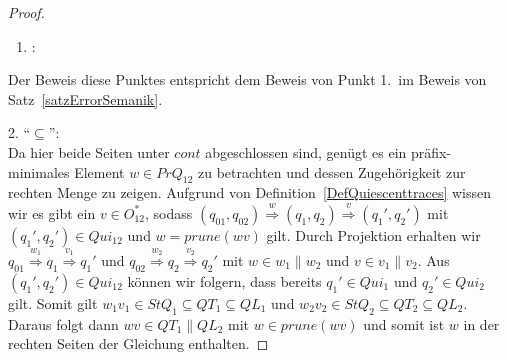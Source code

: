 \begin{proof}
  ~
  \begin{enumerate}
    \item \hspace{-0.2cm}:
  \end{enumerate}
  \vspace{-0.3cm}
  Der Beweis diese Punktes entspricht dem Beweis von Punkt 1.\ im Beweis von
  Satz~\ref{satzErrorSemanik}.

  2. ``$\subseteq$'':\\
  Da hier beide Seiten unter $cont$ abgeschlossen sind, genügt es ein
  präfix-minimales Element $w\in PrQ_{12}$ zu betrachten und dessen
  Zugehörigkeit zur rechten Menge zu zeigen. Aufgrund von
  Definition~\ref{DefQuiescenttraces} wissen wir es gibt ein $v\in O_{12}^*$,
  sodass $(q_{01},q_{02}) \overset{w}{\Rightarrow} (q_1,q_2)
  \overset{v}{\Rightarrow} (q_1',q_2')$ mit $(q_1',q_2')\in Qui_{12}$ und
  $w=prune(wv)$ gilt. Durch Projektion erhalten wir $q_{01}
  \overset{w_1}{\Rightarrow} q_1 \overset{v_1}{\Rightarrow} q_1'$ und $q_{02}
  \overset{w_2}{\Rightarrow} q_2 \overset{v_2}{\Rightarrow} q_2'$ mit $w\in
  w_1\|w_2$ und $v\in v_1\|v_2$. Aus $(q_1',q_2')\in Qui_{12}$ können wir
  folgern, dass bereits $q_1'\in Qui_1$ und $q_2'\in Qui_2$ gilt. Somit gilt
  $w_1v_1\in StQ_1\subseteq QT_1\subseteq QL_1$ und $w_2v_2\in StQ_2\subseteq
  QT_2\subseteq QL_2$. Daraus folgt dann $wv\in QT_1\|QL_2$ mit $w\in
  prune(wv)$ und somit ist $w$ in der rechten Seiten der Gleichung enthalten.


\end{proof}
